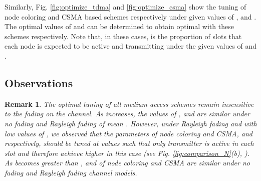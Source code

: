 \documentclass[12pt,english]{article}
\newtheorem{remark}{Remark}[section]
\begin{document}
Similarly, Fig. \ref{fig:optimize_tdma} and \ref{fig:optimize_csma} show the tuning of node coloring and CSMA based schemes respectively under given values of , \mbox{} and \mbox{}. The optimal values of  and  can be determined to obtain optimal  with these schemes respectively. Note that, in these cases,  is the proportion of slots that each node is expected to be active and transmitting under the given values of  and .

\begin{figure*}[!t]
\centering
{}
\caption{Optimal  of slotted ALOHA, node coloring and CSMA based schemes.  is varied,  and .
\label{fig:comparison_N}}
\end{figure*}
\begin{figure*}[!t]
\centering
{}
\caption{Optimal  of slotted ALOHA, node coloring and CSMA based schemes. ,  is varied and .
\label{fig:comparison_K}}
\end{figure*}

\begin{figure*}[!t]
\centering
{}
\caption{Optimal  of slotted ALOHA, node coloring and CSMA based schemes. ,  and  is varied.
\label{fig:comparison_A}}
\end{figure*}

\subsection{Observations}

\begin{remark}
The optimal tuning of all medium access schemes remain insensitive to the fading on the channel. As  increases, the values of ,  and  are similar under {\em no fading} and {\em Rayleigh fading} of mean . However, under {\em Rayleigh fading} and with low values of , we observed that the parameters of node coloring and CSMA,  and  respectively, should be tuned at values such that only  transmitter is active in each slot and therefore achieve higher  in this case (see Fig. \ref{fig:comparison_N}(b), ). As  becomes greater than ,  and  of node coloring and CSMA are similar under {\em no fading} and {\em Rayleigh fading} channel models.
\end{remark}
\end{document}
